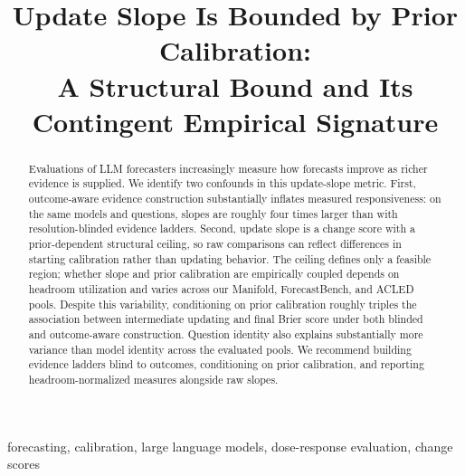 \documentclass[conference]{IEEEtran}
\theoremstyle{plain}
\theoremstyle{remark}
\begin{document}
\title{Update Slope Is Bounded by Prior Calibration:\\
       A Structural Bound and Its Contingent Empirical Signature}

\author{
\and
{}
}

\maketitle

\begin{abstract}
Evaluations of LLM forecasters increasingly measure how forecasts improve as richer evidence is supplied. We identify two confounds in this update-slope metric. First, outcome-aware evidence construction substantially inflates measured responsiveness: on the same models and questions, slopes are roughly four times larger than with resolution-blinded evidence ladders. Second, update slope is a change score with a prior-dependent structural ceiling, so raw comparisons can reflect differences in starting calibration rather than updating behavior. The ceiling defines only a feasible region; whether slope and prior calibration are empirically coupled depends on headroom utilization and varies across our Manifold, ForecastBench, and ACLED pools. Despite this variability, conditioning on prior calibration roughly triples the association between intermediate updating and final Brier score under both blinded and outcome-aware construction. Question identity also explains substantially more variance than model identity across the evaluated pools. We recommend building evidence ladders blind to outcomes, conditioning on prior calibration, and reporting headroom-normalized measures alongside raw slopes.
\end{abstract}

\begin{IEEEkeywords}
forecasting, calibration, large language models, dose-response evaluation, change scores
\end{IEEEkeywords}
\end{document}
